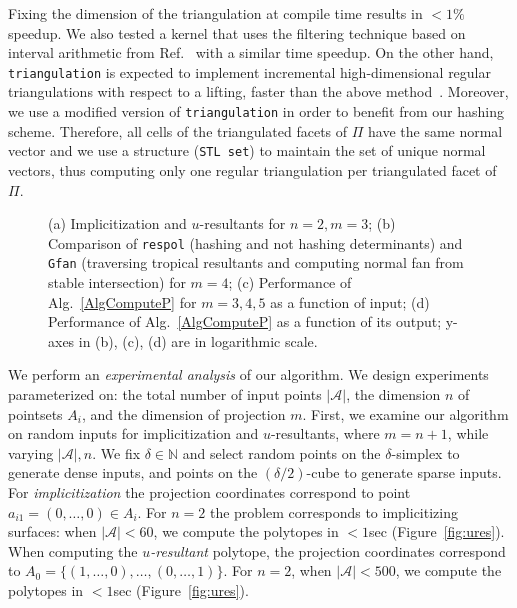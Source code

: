 \documentclass{article}
\newcommand\refcite[1]{\citealp{#1}} \newcommand\citess[1]{\textsuperscript{\textup{\citealp{#1}}}}
\def\NN{{\mathbb N}} \def\QQ{{\mathbb Q}}
\def\A{{\mathcal A}} \def\R{{\mathcal R}}
\begin{document}
Fixing the dimension of the triangulation at compile time
results in $<1\%$ speedup. We also tested a kernel that uses the
filtering technique based on interval arithmetic from Ref.~\refcite{BBP98}
 with a similar time speedup.
On the other hand, {\tt triangulation} is expected to implement
incremental high-dimensional regular triangulations with respect to a lifting,
faster
than the above method~\citess{Devi11perso}.
Moreover, we use a modified version of \texttt{triangulation} in order to
benefit from our hashing scheme.
Therefore, all cells of the triangulated facets of $\varPi$ have the same
normal vector and we use a structure ({\tt STL set}) to maintain the set of
unique normal vectors, thus computing only one regular triangulation
per triangulated facet of $\varPi$.


\begin{figure*}[t]
  \centering
{}
\quad
{}
\caption{
(a) Implicitization and $u$-resultants for $n=2, m=3$;
(b) Comparison of \texttt{respol} (hashing and not hashing
determinants) and \texttt{Gfan} (traversing tropical resultants and
computing normal fan from stable intersection) for $m=4$;
(c) Performance of Alg.~\ref{AlgComputeP} for $m=3,4,5$ as a function of
input;
(d) Performance of Alg.~\ref{AlgComputeP} as a function of its output;
y-axes in (b), (c), (d) are in logarithmic scale.
}
\end{figure*}

We perform an \textit{experimental analysis} of our algorithm.  
We design experiments parameterized on:
the total number of input points $|\A|$, 
the dimension $n$ of pointsets $A_i$, and the dimension of projection $m$.
First, we examine our algorithm on random inputs for implicitization and
$u$-resultants, where $m=n+1$, while varying $|\A|, n$.
We fix $\delta\in\NN$ and select random points on the $\delta$-simplex
to generate dense inputs, and points on the $(\delta/2)$-cube
to generate sparse inputs.
For {\it implicitization} the projection coordinates correspond to
point $a_{i1}=(0,\ldots,0)\in A_i$.
For $n=2$ the problem corresponds to implicitizing surfaces:
when $|\A|<60$, we compute the polytopes in $<1$sec 
(Figure~\ref{fig:ures}).
When computing the {\it $u$-resultant} polytope, 
the projection coordinates correspond to 
$A_0=\{(1,\ldots,0),\ldots,(0,\dots,1)\}$. 
For $n=2$, 
when $|\A|<500$, we compute the polytopes in $<1$sec 
(Figure~\ref{fig:ures}).
\end{document}
